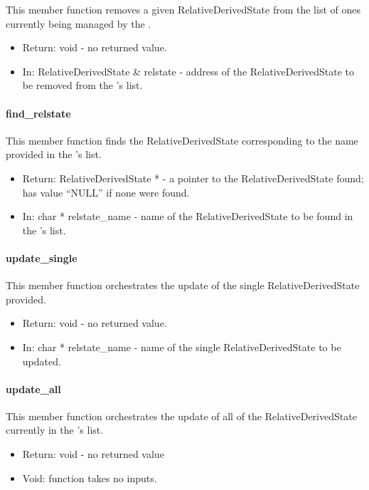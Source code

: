 This member function removes a given RelativeDerivedState from the list of
ones currently being managed by the \relkinDesc.

\begin{itemize}
\item{Return:} void - no returned value.
\item{In:} RelativeDerivedState \& relstate - address of the
RelativeDerivedState to be removed from the \relkinDesc's list.
\end{itemize}

\paragraph{find\_relstate}

This member function finds the RelativeDerivedState corresponding to the name
provided in the \relkinDesc's list.

\begin{itemize}
\item{Return:} RelativeDerivedState * - a pointer to the RelativeDerivedState
found; has value ``NULL'' if none were found.
\item{In:} char * relstate\_name - name of the
RelativeDerivedState to be found in the \relkinDesc's list.
\end{itemize}

\paragraph{update\_single}

This member function orchestrates the update of the single
RelativeDerivedState provided.

\begin{itemize}
\item{Return:} void - no returned value.
\item{In:} char * relstate\_name - name of the single
RelativeDerivedState to be updated.
\end{itemize}

\paragraph{update\_all}

This member function orchestrates the update of all of the
RelativeDerivedState currently in the \relkinDesc's list.

\begin{itemize}
\item{Return:} void - no returned value
\item{Void:} function takes no inputs.
\end{itemize}

